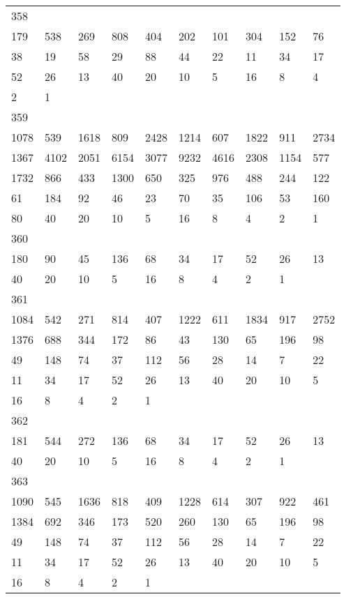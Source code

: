 \begin{longtable}{*{10}{l}}
358&&&&&&&&&\\
179& 538& 269& 808& 404& 202& 101& 304& 152& 76\\
38& 19& 58& 29& 88& 44& 22& 11& 34& 17\\
52& 26& 13& 40& 20& 10& 5& 16& 8& 4\\
2& 1& \\

359&&&&&&&&&\\
1078& 539& 1618& 809& 2428& 1214& 607& 1822& 911& 2734\\
1367& 4102& 2051& 6154& 3077& 9232& 4616& 2308& 1154& 577\\
1732& 866& 433& 1300& 650& 325& 976& 488& 244& 122\\
61& 184& 92& 46& 23& 70& 35& 106& 53& 160\\
80& 40& 20& 10& 5& 16& 8& 4& 2& 1\\

360&&&&&&&&&\\
180& 90& 45& 136& 68& 34& 17& 52& 26& 13\\
40& 20& 10& 5& 16& 8& 4& 2& 1& \\

361&&&&&&&&&\\
1084& 542& 271& 814& 407& 1222& 611& 1834& 917& 2752\\
1376& 688& 344& 172& 86& 43& 130& 65& 196& 98\\
49& 148& 74& 37& 112& 56& 28& 14& 7& 22\\
11& 34& 17& 52& 26& 13& 40& 20& 10& 5\\
16& 8& 4& 2& 1& \\

362&&&&&&&&&\\
181& 544& 272& 136& 68& 34& 17& 52& 26& 13\\
40& 20& 10& 5& 16& 8& 4& 2& 1& \\

363&&&&&&&&&\\
1090& 545& 1636& 818& 409& 1228& 614& 307& 922& 461\\
1384& 692& 346& 173& 520& 260& 130& 65& 196& 98\\
49& 148& 74& 37& 112& 56& 28& 14& 7& 22\\
11& 34& 17& 52& 26& 13& 40& 20& 10& 5\\
16& 8& 4& 2& 1& \\


\end{longtable}
